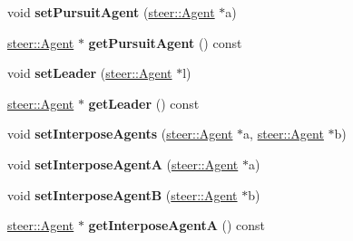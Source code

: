 \begin{DoxyCompactItemize}
\item 
\hypertarget{classsteer_1_1_super_component_a7aeb081585a3126c91468184b1485d39}{void {\bfseries set\-Pursuit\-Agent} (\hyperlink{classsteer_1_1_agent}{steer\-::\-Agent} $\ast$a)}\label{classsteer_1_1_super_component_a7aeb081585a3126c91468184b1485d39}

\item 
\hypertarget{classsteer_1_1_super_component_abde4df825e54ee1b7dd612947182c73c}{\hyperlink{classsteer_1_1_agent}{steer\-::\-Agent} $\ast$ {\bfseries get\-Pursuit\-Agent} () const }\label{classsteer_1_1_super_component_abde4df825e54ee1b7dd612947182c73c}

\item 
\hypertarget{classsteer_1_1_super_component_ac6e8260adba8788734c07fabcd1d846a}{void {\bfseries set\-Leader} (\hyperlink{classsteer_1_1_agent}{steer\-::\-Agent} $\ast$l)}\label{classsteer_1_1_super_component_ac6e8260adba8788734c07fabcd1d846a}

\item 
\hypertarget{classsteer_1_1_super_component_a50f71ec70224b10c71241ef7bbdcabe4}{\hyperlink{classsteer_1_1_agent}{steer\-::\-Agent} $\ast$ {\bfseries get\-Leader} () const }\label{classsteer_1_1_super_component_a50f71ec70224b10c71241ef7bbdcabe4}

\item 
\hypertarget{classsteer_1_1_super_component_af024f5ae5b4d77e93a576806be160903}{void {\bfseries set\-Interpose\-Agents} (\hyperlink{classsteer_1_1_agent}{steer\-::\-Agent} $\ast$a, \hyperlink{classsteer_1_1_agent}{steer\-::\-Agent} $\ast$b)}\label{classsteer_1_1_super_component_af024f5ae5b4d77e93a576806be160903}

\item 
\hypertarget{classsteer_1_1_super_component_ad9e2774c665eec1727f2cd0ddd763705}{void {\bfseries set\-Interpose\-Agent\-A} (\hyperlink{classsteer_1_1_agent}{steer\-::\-Agent} $\ast$a)}\label{classsteer_1_1_super_component_ad9e2774c665eec1727f2cd0ddd763705}

\item 
\hypertarget{classsteer_1_1_super_component_a98d56c5408bf60bdb6f4a60194e94564}{void {\bfseries set\-Interpose\-Agent\-B} (\hyperlink{classsteer_1_1_agent}{steer\-::\-Agent} $\ast$b)}\label{classsteer_1_1_super_component_a98d56c5408bf60bdb6f4a60194e94564}

\item 
\hypertarget{classsteer_1_1_super_component_a43f0c97eab839cf58023b9228a37f65c}{\hyperlink{classsteer_1_1_agent}{steer\-::\-Agent} $\ast$ {\bfseries get\-Interpose\-Agent\-A} () const }\label{classsteer_1_1_super_component_a43f0c97eab839cf58023b9228a37f65c}


\end{DoxyCompactItemize}
